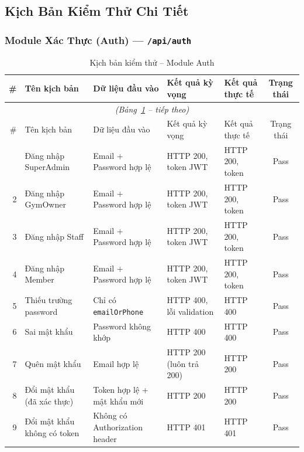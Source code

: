 \subsection{Kịch Bản Kiểm Thử Chi Tiết}

\subsubsection{Module Xác Thực (Auth) — \texttt{/api/auth}}

\begin{longtable}{r p{3.2cm} p{2.8cm} p{2.8cm} p{2cm} c}
\caption{Kịch bản kiểm thử – Module Auth}
\label{tab:tc-auth} \\
\toprule
\# & Tên kịch bản & Dữ liệu đầu vào & Kết quả kỳ vọng & Kết quả thực tế & Trạng thái \\
\midrule
\endfirsthead
\multicolumn{6}{c}{\textit{(Bảng~\ref{tab:tc-auth} – tiếp theo)}} \\ \toprule
\# & Tên kịch bản & Dữ liệu đầu vào & Kết quả kỳ vọng & Kết quả thực tế & Trạng thái \\ \midrule
\endhead \midrule \endfoot \bottomrule \endlastfoot
1 & Đăng nhập SuperAdmin & Email + Password hợp lệ   & HTTP 200, token JWT & HTTP 200, token & Pass \\
2 & Đăng nhập GymOwner   & Email + Password hợp lệ   & HTTP 200, token JWT & HTTP 200, token & Pass \\
3 & Đăng nhập Staff      & Email + Password hợp lệ   & HTTP 200, token JWT & HTTP 200, token & Pass \\
4 & Đăng nhập Member     & Email + Password hợp lệ   & HTTP 200, token JWT & HTTP 200, token & Pass \\
5 & Thiếu trường password & Chỉ có \texttt{emailOrPhone} & HTTP 400, lỗi validation & HTTP 400 & Pass \\
6 & Sai mật khẩu         & Password không khớp       & HTTP 400             & HTTP 400         & Pass \\
7 & Quên mật khẩu        & Email hợp lệ              & HTTP 200 (luôn trả 200) & HTTP 200     & Pass \\
8 & Đổi mật khẩu (đã xác thực) & Token hợp lệ + mật khẩu mới & HTTP 200 & HTTP 200    & Pass \\
9 & Đổi mật khẩu không có token & Không có Authorization header & HTTP 401 & HTTP 401 & Pass \\
\end{longtable}

